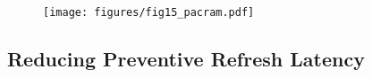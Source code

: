 \begin{figure}[ht]
\centering
\texttt{[image: figures/fig15\_pacram.pdf]}
\caption{}
\label{fig:pacram}
\end{figure}




\subsection{Reducing Preventive Refresh Latency}
\label{sec:mech_reducing}


